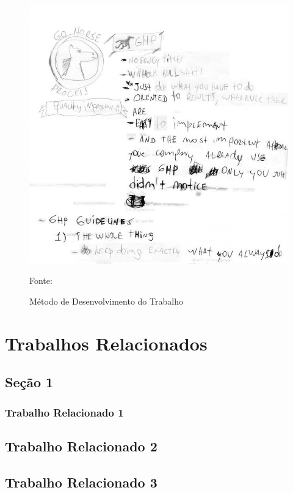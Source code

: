 \begin{figure}[H]
  \centering
  \caption{Método de Desenvolvimento do Trabalho}
 \includegraphics[scale=0.55]{imagens/gohorsenew.jpg} \par
\bigskip
\label{classes}
   Fonte: \cite{gohorse}
\end{figure}


\section{Trabalhos Relacionados}
\label{trabalhos-relacionados}
\subsection{Seção 1}

\subsubsection{Trabalho Relacionado 1}
\label{trab-relacionado-1}


\subsection{Trabalho Relacionado 2}
\label{tra-relacionado-2}


\subsection{Trabalho Relacionado 3}
\label{trab-relacionado-3}